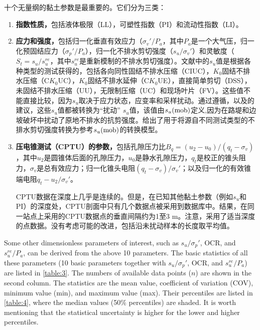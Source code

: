 \begin{paracol}{2}
    \switchcolumn
    
    十个无量纲的黏土参数是最重要的。它们分为三类：
    \begin{enumerate}
        \item \textbf{指数性质，}包括液体极限（LL），可塑性指数（PI）和流动性指数（LI）。
        
        \item \textbf{应力和强度，}包括归一化垂直有效应力（$\sigma_v'/P_a$，其中$P_a$是一个大气压，归一化预固结应力（$\sigma_p'/P_a$），归一化不排水剪切强度（$s_u/\sigma_v'$）和灵敏度（$S_t=s_u/s_u^{re}$，其中$s_u^{re}$是重新模制的不排水剪切强度）。文献中的$s_u$值是根据各种类型的测试获得的，包括各向同性固结不排水压缩（CIUC），$K_0$固结不排水压缩（C$K_0$UC），$K_0$固结不排水延伸（C$K_0$UE），直接简单剪切（DSS），未固结不排水压缩（UU），无限制压缩（UC）和现场叶片（FV）。这些值不能直接比较，因为$s_u$取决于应力状态，应变率和采样扰动。通过遵循\citet{Bjerrum19721}，\citet{Kulhawy1990}以及\citet{Mesri20071}的建议，这些$s_u$值都被转换为“扰动” $s_u$值，该值由$s_u(\rm{mob})$定义,因为在路堤和边坡破坏中扰动了原地不排水的抗剪强度\citep{Mesri20071}。给出了用于将源自不同测试类型的不排水剪切强度转换为参考$s_u(\rm{mob})$的转换模型。
        \item \textbf{压电锥测试（CPTU）的参数，}包括孔隙压力比$B_q=(u_2-u_0)/(q_t-\sigma_v)$，其中$u_2$是圆锥体后面的孔隙压力，$u_0$是静水孔隙压力，$q_t$是校正的锥头阻力，$\sigma_v$是总有效应力；归一化锥头电阻$(q_t-\sigma_v)/\sigma_v'$；以及归一化的有效锥端电阻$q_t-u_2/\sigma_v'$。\par
        CPTU数据在深度上几乎是连续的。但是，在已知其他黏土参数（例如$s_u$和PI）的深度处，CPTU剖面中只有几个数据点被采用到数据库中。结果，在同一站点上采用的CPTU数据点的垂直间隔约为1至3 m。注意，采用了适当深度的点数据。没有考虑可能的改进，包括沿未扰动样本的长度取平均值。
    \end{enumerate}

    
    \switchcolumn*
    
    Some other dimensionless parameters of interest, such as $s_u/\sigma_p'$, OCR, and $s_u^{re}/P_a$, can be derived from the above 10 parameters. The basic statistics of all these parameters (10 basic parameters together with $s_u/\sigma_p'$, OCR, and $s_u^{re}/P_a$) are listed in \autoref{table:3}. The numbers of available data points ($n$) are shown in the second column. The statistics are the mean value, coefficient of variation (COV), minimum value (min), and maximum value (max). Their percentiles are listed in \autoref{table:4}, where the median values (50$\%$ percentiles) are shaded. It is worth mentioning that the statistical uncertainty is higher for the lower and higher percentiles.
    

\end{paracol}
